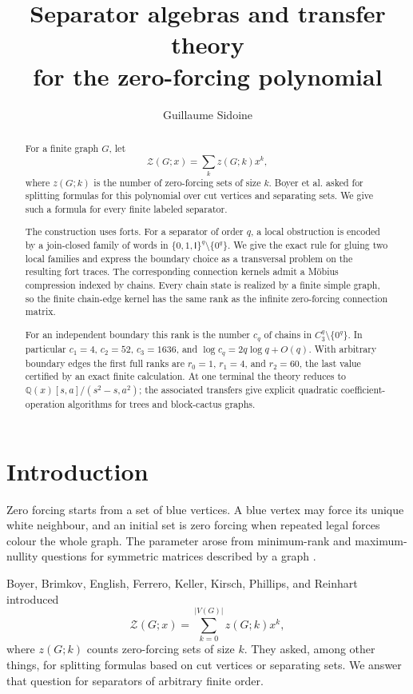\documentclass[11pt,reqno]{amsart}
\title[Separator algebras for the zero-forcing polynomial]
{Separator algebras and transfer theory\\
for the zero-forcing polynomial}
\author{Guillaume Sidoine}
\theoremstyle{definition}
\newcommand{\Zpoly}{\mathcal Z}
\begin{document}
\begin{abstract}
For a finite graph $G$, let
\[
  \Zpoly(G;x)=\sum_k z(G;k)x^k,
\]
where $z(G;k)$ is the number of zero-forcing sets of size $k$.  Boyer et al.
asked for splitting formulas for this polynomial over cut vertices and
separating sets.  We give such a formula for every finite labeled separator.

The construction uses forts.  For a separator of order $q$, a local obstruction
is encoded by a join-closed family of words in
$\{0,1,\mathsf I\}^q\setminus\{0^q\}$.  We give the exact rule for gluing two
local families and express the boundary choice as a transversal problem on the
resulting fort traces.  The corresponding connection kernels admit a M\"obius
compression indexed by chains.  Every chain state is realized by a finite
simple graph, so the finite chain-edge kernel has the same rank as the infinite
zero-forcing connection matrix.

For an independent boundary this rank is the number $c_q$ of chains in
$C_3^q\setminus\{0^q\}$.  In particular
$c_1=4$, $c_2=52$, $c_3=1636$, and
$\log c_q=2q\log q+O(q)$.  With arbitrary boundary edges the first full ranks
are $r_0=1$, $r_1=4$, and $r_2=60$, the last value certified by an exact finite
calculation.  At one terminal the theory reduces to
$\mathbb Q(x)[s,a]/(s^2-s,a^2)$; the associated transfers give explicit
quadratic coefficient-operation algorithms for trees and block-cactus graphs.
\end{abstract}

\maketitle

\section{Introduction}

Zero forcing starts from a set of blue vertices.  A blue vertex may force its
unique white neighbour, and an initial set is zero forcing when repeated legal
forces colour the whole graph.  The parameter arose from minimum-rank and
maximum-nullity questions for symmetric matrices described by a graph
\cite{AIM2008}.

Boyer, Brimkov, English, Ferrero, Keller, Kirsch, Phillips, and Reinhart
\cite{BoyerEtAl2019} introduced
\[
  \Zpoly(G;x)=\sum_{k=0}^{|V(G)|}z(G;k)x^k,
\]
where $z(G;k)$ counts zero-forcing sets of size $k$.  They asked, among other
things, for splitting formulas based on cut vertices or separating sets.  We
answer that question for separators of arbitrary finite order.
\end{document}
